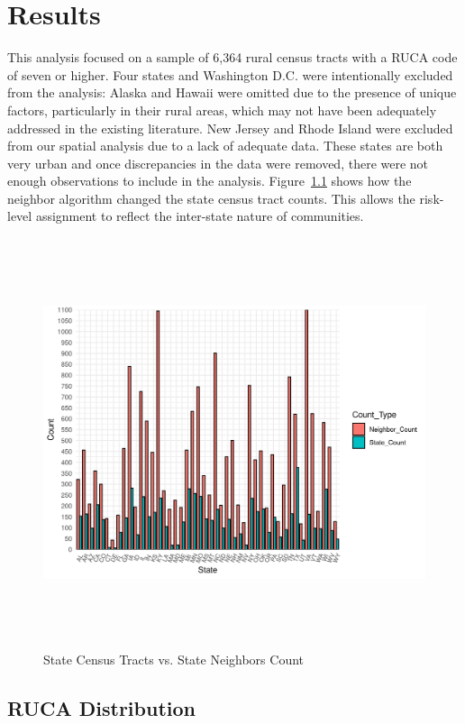 \chapter{Results}	

This analysis focused on a sample of 6,364 rural census tracts with a RUCA code of seven or higher. Four states and Washington D.C. were intentionally excluded from the analysis: Alaska and Hawaii were omitted due to the presence of unique factors, particularly in their rural areas, which may not have been adequately addressed in the existing literature.  New Jersey and Rhode Island were excluded from our spatial analysis due to a lack of adequate data. These states are both very urban and once discrepancies in the data were removed, there were not enough observations to include in the analysis.  Figure~\ref{fig:neighbors_bar} 
shows how the neighbor algorithm changed the state census tract counts. This allows the risk-level assignment to reflect the inter-state nature of communities. 



\begin{figure}[htbp]
   \centering
    \includegraphics[width=1\textwidth, height=12cm]{plots/neighbors.png}
    \caption{State Census Tracts vs. State Neighbors Count}
    \label{fig:neighbors_bar}
\end{figure}



\section{RUCA Distribution}

